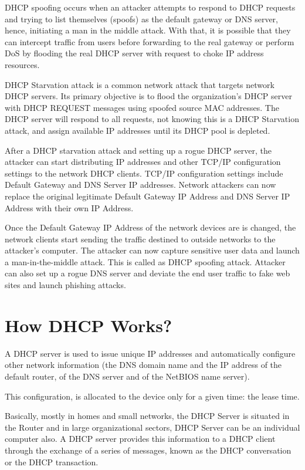 \documentclass[12pt]{article}
\begin{document}
\begin{sloppypar}
	
DHCP spoofing occurs when an attacker attempts to respond to DHCP requests and trying to list themselves (spoofs) as the default gateway or DNS server, hence, initiating a man in the middle attack. With that, it is possible that they can intercept traffic from users before forwarding to the real gateway or perform DoS by flooding the real DHCP server with request to choke IP address resources.

DHCP Starvation attack is a common network attack that targets network DHCP servers. Its primary objective is to flood the organization’s DHCP server with DHCP REQUEST messages using spoofed source MAC addresses. The DHCP server will respond to all requests, not knowing this is a DHCP Starvation attack, and assign available IP addresses until its DHCP pool is depleted.


After a DHCP starvation attack and setting up a rogue DHCP server, the attacker can start distributing IP addresses and other TCP/IP configuration settings to the network DHCP clients. TCP/IP configuration settings include Default Gateway and DNS Server IP addresses. Network attackers can now replace the original legitimate Default Gateway IP Address and DNS Server IP Address with their own IP Address.

Once the Default Gateway IP Address of the network devices are is changed, the network clients start sending the traffic destined to outside networks to the attacker's computer. The attacker can now capture sensitive user data and launch a man-in-the-middle attack. This is called as DHCP spoofing attack. Attacker can also set up a rogue DNS server and deviate the end user traffic to fake web sites and launch phishing attacks.

\section{How DHCP Works?}

\begin{sloppypar}
	
	A DHCP server is used to issue unique IP addresses and automatically configure other network information (the DNS domain name and the IP address of the default router, of the DNS server and of the NetBIOS name server).
	
	This configuration, is allocated to the device only for a given time: the lease time.
	
	
	Basically, mostly in homes and small networks, the DHCP Server is situated in the Router and in large organizational sectors, DHCP Server can be an individual computer also. A DHCP server provides this information to a DHCP client through the exchange of a series of messages, known as the DHCP conversation or the DHCP transaction.
	

\end{sloppypar}
\end{sloppypar}
\end{document}
